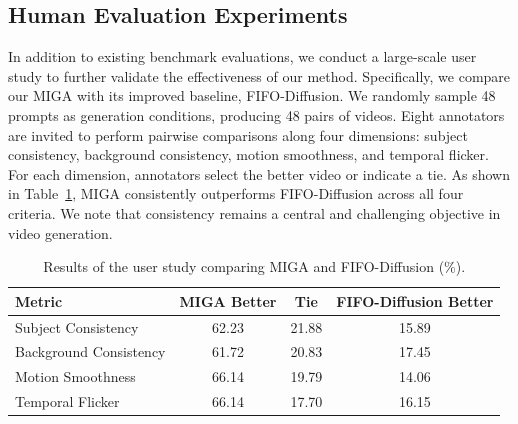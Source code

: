 \documentclass{article}
\theoremstyle{plain}
\theoremstyle{definition}
\theoremstyle{remark}
\begin{document}
\subsection{Human Evaluation Experiments}
\label{app:user_study}

In addition to existing benchmark evaluations, we conduct a large-scale user study to further validate the effectiveness of our method.
Specifically, we compare our MIGA with its improved baseline, FIFO-Diffusion. We randomly sample 48 prompts as generation conditions, producing 48 pairs of videos. Eight annotators are invited to perform pairwise comparisons along four dimensions: subject consistency, background consistency, motion smoothness, and temporal flicker. For each dimension, annotators select the better video or indicate a tie. As shown in Table~\ref{tab:user_study}, MIGA consistently outperforms FIFO-Diffusion across all four criteria. We note that consistency remains a central and challenging objective in video generation.

\begin{table}[htbp]
    \centering
    \small
    \caption{Results of the user study comparing MIGA and FIFO-Diffusion (\%).}
    \label{tab:user_study}
    \begin{tabular}{lccc}
        \toprule
        \textbf{Metric} & \textbf{MIGA Better} & \textbf{Tie} & \textbf{FIFO-Diffusion Better} \\
        \midrule
        Subject Consistency     & 62.23 & 21.88 & 15.89 \\
        Background Consistency  & 61.72 & 20.83 & 17.45 \\
        Motion Smoothness       & 66.14 & 19.79 & 14.06 \\
        Temporal Flicker        & 66.14 & 17.70 & 16.15 \\
        \bottomrule
    \end{tabular}
\end{table}




\end{document}
